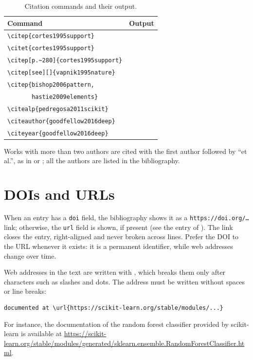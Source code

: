 \begin{table}[htbp]
  \centering
  \caption{Citation commands and their output.}
  \label{tab:cite}
  \begin{tabular}{ll}
    \toprule
    Command & Output \\
    \midrule
    \verb|\citep{cortes1995support}|            & \citep{cortes1995support} \\
    \verb|\citet{cortes1995support}|            & \citet{cortes1995support} \\
    \verb|\citep[p.~280]{cortes1995support}|    & \citep[p.~280]{cortes1995support} \\
    \verb|\citep[see][]{vapnik1995nature}|      & \citep[see][]{vapnik1995nature} \\
    \verb|\citep{bishop2006pattern,|            & \citep{bishop2006pattern,hastie2009elements} \\
    \verb|       hastie2009elements}|           & \\
    \verb|\citealp{pedregosa2011scikit}|        & \citealp{pedregosa2011scikit} \\
    \verb|\citeauthor{goodfellow2016deep}|      & \citeauthor{goodfellow2016deep} \\
    \verb|\citeyear{goodfellow2016deep}|        & \citeyear{goodfellow2016deep} \\
    \bottomrule
  \end{tabular}
\end{table}

Works with more than two authors are cited with the first author followed
by ``et al.'', as in \citet{hastie2009elements} or
\citet{pedregosa2011scikit}; all the authors are listed in the
bibliography.

\section{DOIs and URLs}

When an entry has a \texttt{doi} field, the bibliography shows it as a
\texttt{https://doi.org/\dots} link; otherwise, the \texttt{url} field is
shown, if present (see the entry of \citealp{goodfellow2016deep}). The link
closes the entry, right-aligned and never broken across lines. Prefer the
DOI to the URL whenever it exists: it is a permanent identifier, while web
addresses change over time.

Web addresses in the text are written with , which breaks them only
after characters such as slashes and dots. The address must be written
without spaces or line breaks:
\begin{Verbatim}
documented at \url{https://scikit-learn.org/stable/modules/...}
\end{Verbatim}
For instance, the documentation of the random forest classifier provided
by scikit-learn is available at
\url{https://scikit-learn.org/stable/modules/generated/sklearn.ensemble.RandomForestClassifier.html}.


